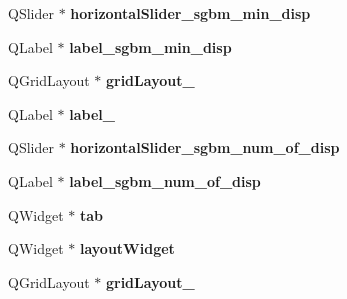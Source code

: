 \begin{DoxyCompactItemize}
\item 
\hypertarget{class_ui__stereo_match_param_form_a6e4dc6a079d9683a99081c6f76435cdb}{}Q\+Slider $\ast$ {\bfseries horizontal\+Slider\+\_\+sgbm\+\_\+min\+\_\+disp}\label{class_ui__stereo_match_param_form_a6e4dc6a079d9683a99081c6f76435cdb}

\item 
\hypertarget{class_ui__stereo_match_param_form_a68c281ec8c86df87af5cacea5615692d}{}Q\+Label $\ast$ {\bfseries label\+\_\+sgbm\+\_\+min\+\_\+disp}\label{class_ui__stereo_match_param_form_a68c281ec8c86df87af5cacea5615692d}

\item 
\hypertarget{class_ui__stereo_match_param_form_a259143b1b23d4326d004e4ae0b397a38}{}Q\+Grid\+Layout $\ast$ {\bfseries grid\+Layout\+\_}\label{class_ui__stereo_match_param_form_a259143b1b23d4326d004e4ae0b397a38}

\item 
\hypertarget{class_ui__stereo_match_param_form_a43f58321c5b15099097d20e9bc9ccc33}{}Q\+Label $\ast$ {\bfseries label\+\_}\label{class_ui__stereo_match_param_form_a43f58321c5b15099097d20e9bc9ccc33}

\item 
\hypertarget{class_ui__stereo_match_param_form_a1d00320c458213fc3aca20d411d919d5}{}Q\+Slider $\ast$ {\bfseries horizontal\+Slider\+\_\+sgbm\+\_\+num\+\_\+of\+\_\+disp}\label{class_ui__stereo_match_param_form_a1d00320c458213fc3aca20d411d919d5}

\item 
\hypertarget{class_ui__stereo_match_param_form_aefa17e9cfd7c13f9cd309258ffd3285c}{}Q\+Label $\ast$ {\bfseries label\+\_\+sgbm\+\_\+num\+\_\+of\+\_\+disp}\label{class_ui__stereo_match_param_form_aefa17e9cfd7c13f9cd309258ffd3285c}

\item 
\hypertarget{class_ui__stereo_match_param_form_adeb716a72003db1c76d626d46b3cdeec}{}Q\+Widget $\ast$ {\bfseries tab}\label{class_ui__stereo_match_param_form_adeb716a72003db1c76d626d46b3cdeec}

\item 
\hypertarget{class_ui__stereo_match_param_form_aed1473a88a5a5319d988ced9499151c1}{}Q\+Widget $\ast$ {\bfseries layout\+Widget}\label{class_ui__stereo_match_param_form_aed1473a88a5a5319d988ced9499151c1}

\item 
\hypertarget{class_ui__stereo_match_param_form_a673b087be306990110f56e83963ff058}{}Q\+Grid\+Layout $\ast$ {\bfseries grid\+Layout\+\_}\label{class_ui__stereo_match_param_form_a673b087be306990110f56e83963ff058}


\end{DoxyCompactItemize}

